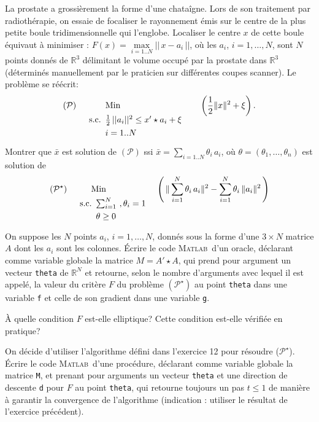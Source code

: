 \documentclass[12pt,a4paper,fleqn]{report}
\newcommand{\matlab}{\textsc{Matlab}}
\newcommand{\R}{\mathbb R}
\renewcommand{\P}{\mathcal P}
\newcommand{\push}[1]{\rule{0pt}{0pt}\hspace{#1pt}}
\begin{document}
\begin{exercice}
La prostate a grossi\`erement la forme d'une chataîgne. Lors de son traitement par radioth\'erapie, on essaie de focaliser le rayonnement \'emis sur le centre de la plus petite boule tridimensionnelle qui l'englobe. Localiser le centre $x$ de cette boule \'equivaut \`a minimiser : $ F(x)=\underset{i=1..N}{\max} ||\,x-a_i\,|| $, o\`u les $a_i$, $i=1,\ldots,N$, sont $N$ points donn\'es de $\R^3$ d\'elimitant le volume occup\'e par la prostate dans $\R^3$ (d\'etermin\'es manuellement par le praticien sur diff\'erentes coupes scanner).
Le probl\`eme se r\'e\'ecrit: 
\[
 (\P) \push{15}\underset{\rule{0pt}{15pt}\mbox{s.c.}\push{5}\parbox[t]{100pt}{$\frac{1}{2}\,||a_i||^2\leq x'\star a_i + \xi$ \\ \rule{0pt}{11pt}$i=1..N$}}{\mbox{Min \rule{60pt}{0pt}}} \push{10}\left( \frac{1}{2} \| x\|^2 +\xi \right).
\]
\begin{questions}
\item Montrer que $\bar x$ est solution de $(\P)$ ssi $\bar x=\sum_{i=1..N} \theta_i \,a_i$, o\`u $ \theta=( \theta_1, \ldots, \theta_n)$ est solution de
\[
(\P^{\star})\push{15}\underset{\rule{0pt}{15pt} \mbox{s.c.}\push{5}\parbox[t]{70pt}{$\sum_{i=1}^N \ ,\theta_i=1$\\ \rule{0pt}{11pt}$ \theta \geq 0$}}{\mbox{Min}\rule{45pt}{0pt}} \left(\,\|\sum_{i=1}^N \theta_i\,a_i\|^2-\sum_{i=1}^N \theta_i\,\|a_i\|^2\,\right)
\]
\item On suppose les $N$ points $a_i$, $i=1,\ldots,N$, donn\'es sous la forme d'une $3\times N$ matrice $A$ dont les $a_i$ sont les colonnes. \'Ecrire le code \matlab\ d'un oracle, d\'eclarant comme variable globale la matrice $M=A' \star A$, qui prend pour argument un vecteur \texttt{theta} de $\R^N$ et retourne, selon le nombre d'arguments avec lequel il est appel\'e, la valeur du crit\`ere $F$ du probl\`eme $(\P^{\star})$ au point \texttt{theta} dans une variable  \texttt f et celle de son gradient dans une variable \texttt g.
\item \`A quelle condition $F$ est-elle elliptique? Cette condition est-elle v\'erifi\'ee en pratique?
\item On d\'ecide d'utiliser l'algorithme d\'efini dans l'exercice 12 pour r\'esoudre ($\P^{\star}$). \'Ecrire le code \matlab\ d'une proc\'edure, d\'eclarant comme variable globale la matrice \texttt M, et prenant pour arguments un vecteur \texttt{theta} et une direction de descente \texttt d pour $F$ au point \texttt{theta}, qui retourne toujours un pas $t\leq 1$ de mani\`ere \`a garantir la convergence de l'algorithme (indication : utiliser le r\'esultat de l'exercice pr\'ec\'edent).
\end{questions}
\end{exercice}
 
\end{document}
